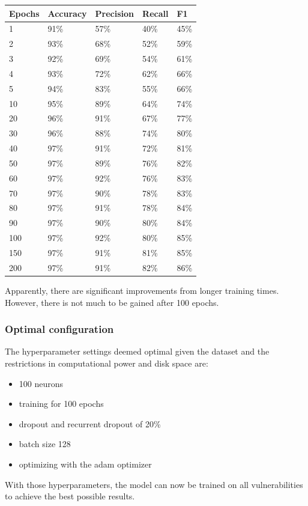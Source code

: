 \documentclass[
	a4paper,
	pagesize,
	pdftex,
	12pt,
	twoside, %
	BCOR=5mm, %
	ngerman,
	fleqn,
	final,
	]{scrartcl}
\begin{document}
\begin{tabular}{ | p{2cm} || p{2cm}|p{2cm}|p{2cm}|p{2cm}|  }
	\hline
	Epochs & Accuracy & Precision & Recall & F1 \\
	\hline
	1 & 91\% &  57\% &  40\% &  45\% \\
	2 & 93\% &  68\% &  52\% &  59\% \\
	3 &  92\%&  69\%&   54\%&  61\% \\
	4 &  93\%&  72\%&   62\%&  66\% \\
	5 &  94\%&  83\%&   55\%&  66\% \\
	10 &  95\%&  89\%&   64\%&  74\% \\
	20 &  96\%&  91\%&   67\%&  77\% \\
	30 &  96\%&  88\%&   74\%&  80\% \\
	40 &  97\%&  91\%&   72\%&  81\% \\
	50 &  97\%&  89\%&   76\%&  82\% \\
	60 &  97\%&  92\%&   76\%&  83\% \\
	70 &  97\%&  90\%&   78\%&  83\% \\
	80 &  97\%&  91\%&   78\%&  84\% \\
	90 &  97\%&  90\%&   80\%&  84\% \\
	100 &  97\%&  92\%&   80\%&  85\% \\
	150 &  97\%&  91\%&   81\%&  85\% \\
	200 &  97\%&  91\%&   82\%&  86\% \\
	\hline
	\hline
\end{tabular}

Apparently, there are significant improvements from longer training times. However, there is not much to be gained after 100 epochs.

\subsubsection{Optimal configuration}

The hyperparameter settings deemed optimal given the dataset and the restrictions in computational power and disk space are:
\begin{itemize}
	\item 100 neurons
	\item training for 100 epochs
	\item dropout and recurrent dropout of 20\%
	\item batch size 128
	\item optimizing with the adam optimizer
\end{itemize}
With those hyperparameters, the model can now be trained on all vulnerabilities to achieve the best possible results.
\end{document}
